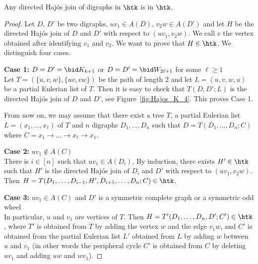 \begin{lemma}\label{lem:HJ_preserve_htk}
Any directed Haj\'os join of digraphs in $\htk$ is in $\htk$.
\end{lemma}

\begin{proof}
    Let $D$, $D'$ be two digraphs, $uv_1 \in A(D)$, $v_2w \in A(D')$ and let $H$ be the directed Haj\'os join of $D$ and $D'$ with respect to $(uv_1, v_2w)$. We call $v$ the vertex obtained after identifying $v_1$ and $v_2$. 
     We want to prove that $H \in \htk$. We distinguish four cases. 


    \noindent\textbf{Case 1:} $D=D'=\bid K_{k+1}$ or $D = D' = \bid W_{2\ell + 1}$ for some $\ell \geq 1$\\ 
    Let $T = (\{u,v,w\}, \{uv,vw\})$ be the path of length $2$ and let $L=(u,v,w,u)$ be a partial Eulerian list of $T$. Then it is easy to check that $T(D, D'; L)$ is the directed Haj\'os join of $D$ and $D'$, see Figure~\ref{fig:Hajos_K_4}. This proves Case 1. \smallskip 


    From now on, we may assume that there exist a tree $T$, a partial Eulerian list $L=(x_1, \dots, x_{\ell})$ of $T$ and $n$ digraphs $D_1, \dots, D_n$ such that $D = T(D_1, \dots, D_n; C)$ where $C=x_1 \rightarrow \dots \rightarrow x_{\ell} \rightarrow x_1$.


    \noindent\textbf{Case 2:} $uv_1 \notin A(C)$\\     
    There is $i \in [n]$ such that $uv_1 \in A(D_i)$. 
    By induction, there exists $H' \in \htk$ such that $H'$ is the directed Haj\'os join of $D_i$ and $D'$ with respect to $(uv_1, v_2w)$. Then $H=T(D_1, \dots, D_{i-1}, H', D_{i+1}, \dots, D_{n}; C) \in \htk$. \smallskip
    
    \noindent\textbf{Case 3:} $uv_1 \in A(C)$ and $D'$ is a symmetric complete graph or a symmetric odd wheel\\
    In particular, $u$ and $v_1$ are vertices of $T$. 
    Then  $H=T'(D_1, \dots, D_n, D'; C') \in \htk$, where $T'$ is obtained from $T$ by adding the vertex $w$ and the edge $v_1w$, and $C'$ is obtained from the partial Eulerian list $L'$ obtained from $L$ by adding $w$ between $u$ and $v_1$ (in other words the peripheral cycle $C'$ is obtained from $C$ by deleting $uv_1$ and adding $uw$ and $wv_1$). 
    \smallskip 


\end{proof}
